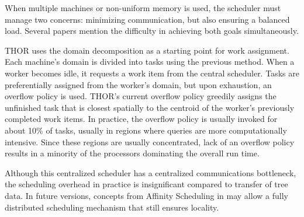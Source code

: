 \documentclass[twoside,leqno,twocolumn]{article}
\newcommand{\authornote}[1]{(\footnote{Note to self: #1})}
\newcommand{\authorsnote}[1]{\authornote{#1}}
\begin{document}
When multiple machines or non-uniform memory is used, the scheduler must manage two concerns: minimizing communication, but also ensuring a balanced load.
Several papers \cite{markatos92using, salmon_thesis} mention the difficulty in achieving both goals simultaneously.

THOR uses the domain decomposition as a starting point for work assignment.
Each machine's domain is divided into tasks using the previous method.
When a worker becomes idle, it requests a work item from the central scheduler.
Tasks are preferentially assigned from the worker's domain, but upon exhaustion, an overflow policy is used.
THOR's current overflow policy greedily assigns the unfinished task that is closest spatially to the centroid of the worker's previously completed work items.
In practice, the overflow policy is usually invoked for about 10\% of tasks, usually in regions where queries are more computationally intensive.
Since these regions are usually concentrated, lack of an overflow policy results in a minority of the processors dominating the overall run time.

Although this centralized scheduler has a centralized communications bottleneck, the scheduling overhead in practice is insignificant compared to transfer of tree data.
In future versions, concepts from Affinity Scheduling in \cite{markatos92using} may allow a fully distributed scheduling mechanism that still ensures locality.


\end{document}
